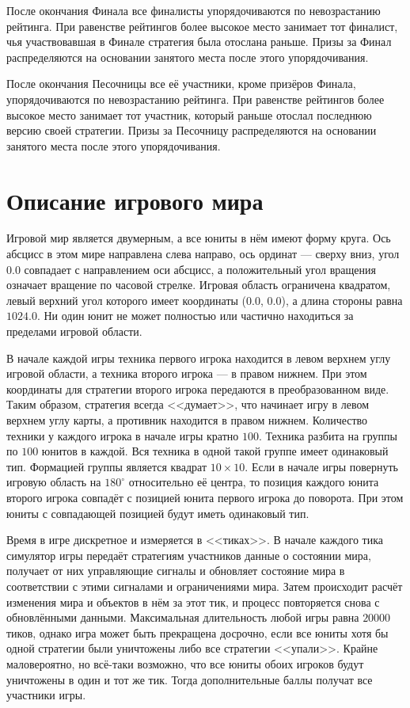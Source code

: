 После окончания Финала все финалисты упорядочиваются по невозрастанию рейтинга. При равенстве рейтингов более высокое место занимает тот
финалист, чья участвовавшая в Финале стратегия была отослана раньше. Призы за Финал распределяются на основании занятого места после этого
упорядочивания.

После окончания Песочницы все её участники, кроме призёров Финала, упорядочиваются по невозрастанию рейтинга. При равенстве рейтингов более
высокое место занимает тот участник, который раньше отослал последнюю версию своей стратегии. Призы за Песочницу распределяются на основании
занятого места после этого упорядочивания.

\section{Описание игрового мира}

Игровой мир является двумерным, а все юниты в нём имеют форму круга. Ось абсцисс в этом мире направлена слева направо, ось ординат ---
сверху вниз, угол $0.0$ совпадает с направлением оси абсцисс, а положительный угол вращения означает вращение по часовой стрелке. Игровая
область ограничена квадратом, левый верхний угол которого имеет координаты ($0.0$, $0.0$), а длина стороны равна $1024.0$. Ни один юнит не
может полностью или частично находиться за пределами игровой области.

В начале каждой игры техника первого игрока находится в левом верхнем углу игровой области, а техника второго игрока --- в правом нижнем.
При этом координаты для стратегии второго игрока передаются в преобразованном виде. Таким образом, стратегия всегда <<думает>>, что начинает
игру в левом верхнем углу карты, а противник находится в правом нижнем. Количество техники у каждого игрока в начале игры кратно $100$.
Техника разбита на группы по $100$ юнитов в каждой. Вся техника в одной такой группе имеет одинаковый тип. Формацией группы является квадрат
$10\times10$. Если в начале игры повернуть игровую область на $180^\circ$ относительно её центра, то позиция каждого юнита второго игрока
совпадёт с позицией юнита первого игрока до поворота. При этом юниты с совпадающей позицией будут иметь одинаковый тип.

Время в игре дискретное и измеряется в <<тиках>>. В начале каждого тика симулятор игры передаёт стратегиям участников данные о состоянии
мира, получает от них управляющие сигналы и обновляет состояние мира в соответствии с этими сигналами и ограничениями мира. Затем происходит
расчёт изменения мира и объектов в нём за этот тик, и процесс повторяется снова с обновлёнными данными. Максимальная длительность любой игры
равна $20000$ тиков, однако игра может быть прекращена досрочно, если все юниты хотя бы одной стратегии были уничтожены либо все стратегии
<<упали>>. Крайне маловероятно, но всё-таки возможно, что все юниты обоих игроков будут уничтожены в один и тот же тик. Тогда дополнительные
баллы получат все участники игры.

